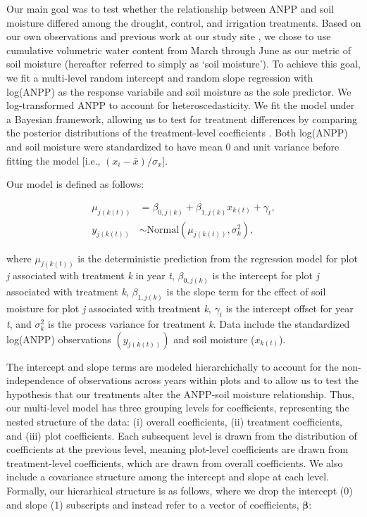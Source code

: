 \documentclass[fleqn,10pt,lineno]{wlpeerj} %
\begin{document}
Our main goal was to test whether the relationship between ANPP and soil
moisture differed among the drought, control, and irrigation treatments.
Based on our own observations and previous work at our study site
\citep{Blaisdell1958, Dalgleish2011, Adler2012}, we chose to use
cumulative volumetric water content from March through June as our
metric of soil moisture (hereafter referred to simply as `soil
moisture'). To achieve this goal, we fit a multi-level random intercept
and random slope regression with log(ANPP) as the response variabile and
soil moisture as the sole predictor. We log-transformed ANPP to account
for heteroscedasticity. We fit the model under a Bayesian framework,
allowing us to test for treatment differences by comparing the posterior
distributions of the treatment-level coefficients
\citep[e.g.,][]{Tredennick2013}. Both log(ANPP) and soil moisture were
standardized to have mean 0 and unit variance before fitting the model
{[}i.e., \((x_i - \bar{x})/\sigma_x\){]}.

Our model is defined as follows:

\vspace{-2em}

\begin{align}
\mu_{j(k(t))} &= \beta_{0,j(k)} + \beta_{1,j(k)}x_{k(t)} + \gamma_t, \\
y_{j(k(t))} &\sim \text{Normal} \left(\mu_{j(k(t))}, \sigma^2_{k} \right),
\end{align}

\noindent{}where \(\mu_{j(k(t))}\) is the deterministic prediction from
the regression model for plot \emph{j} associated with treatment
\emph{k} in year \emph{t}, \(\beta_{0,j(k)}\) is the intercept for plot
\emph{j} associated with treatment \emph{k}, \(\beta_{1,j(k)}\) is the
slope term for the effect of soil moisture for plot \emph{j} associated
with treatment \emph{k}, \(\gamma_t\) is the intercept offset for year
\emph{t}, and \(\sigma^2_k\) is the process variance for treatment
\emph{k}. Data include the standardized log(ANPP) observations
\(\left( y_{j(k(t))} \right)\) and soil moisture (\(x_{k(t)}\)).

The intercept and slope terms are modeled hierarchichally to account for
the non-independence of observations across years within plots and to
allow us to test the hypothesis that our treatments alter the ANPP-soil
moisture relationship. Thus, our multi-level model has three grouping
levels for coefficients, representing the nested structure of the data:
(i) overall coefficients, (ii) treatment coefficients, and (iii) plot
coefficients. Each subsequent level is drawn from the distribution of
coefficients at the previous level, meaning plot-level coefficients are
drawn from treatment-level coefficients, which are drawn from overall
coefficients. We also include a covariance structure among the intercept
and slope at each level. Formally, our hierarhical structure is as
follows, where we drop the intercept (0) and slope (1) subscripts and
instead refer to a vector of coefficients, \(\boldsymbol{\beta}\):
\end{document}
